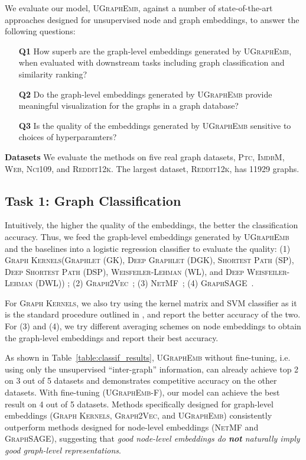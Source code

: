 \documentclass{article}
\newcommand{\model}{\textsc{UGraphEmb}\xspace}
\newcommand{\netmf}{\textsc{NetMF}\xspace}
\newcommand{\graphsage}{\textsc{GraphSAGE}\xspace}
\newcommand{\gk}{\textsc{Graph Kernels}\xspace}
\newcommand{\gv}{\textsc{Graph2Vec}\xspace}
\newcommand{\ptc}{\textsc{Ptc}\xspace}
\newcommand{\imdb}{\textsc{ImdbM}\xspace}
\newcommand{\web}{\textsc{Web}\xspace}
\newcommand{\nci}{\textsc{Nci109}\xspace}
\newcommand{\reddit}{\textsc{Reddit12k}\xspace}
\begin{document}
We evaluate our model, \model, against a number of state-of-the-art approaches designed for unsupervised node and graph embeddings, to answer the following questions:
\begin{enumerate}
\item[{\bf Q1}] How superb are the graph-level embeddings generated by \model, when evaluated with downstream tasks including graph classification and similarity ranking?
\item[{\bf Q2}] Do the graph-level embeddings generated by \model provide meaningful visualization for the graphs in a graph database? 
\item[{\bf Q3}] Is the quality of the embeddings generated by \model sensitive to choices of hyperparamters?
\end{enumerate}



\textbf{Datasets} \enspace We evaluate the methods on five real graph datasets, \ptc, \imdb, \web, \nci, and \reddit.
The largest dataset, \reddit, has 11929 graphs.

\subsection{Task 1: Graph Classification}



Intuitively, the higher the quality of the embeddings, the better the classification accuracy. Thus, we feed the graph-level embeddings generated by \model and the baselines into a logistic regression classifier to evaluate the quality: (1) \gk (\textsc{Graphlet} (\textsc{GK}), \textsc{Deep Graphlet} (\textsc{DGK}), \textsc{Shortest Path} (\textsc{SP}), \textsc{Deep Shortest Path} (\textsc{DSP}), \textsc{Weisfeiler-Lehman} (\textsc{WL}), and \textsc{Deep Weisfeiler-Lehman} (\textsc{DWL}))
; (2) \gv~\cite{narayanan2017graph2vec}; (3) \netmf~\cite{qiu2017network}; (4) \graphsage~\cite{hamilton2017inductive}. 

For \gk, we also try using the kernel matrix and SVM classifier as it is the standard procedure outlined in \cite{yanardag2015deep}, and report the better accuracy of the two. For (3) and (4), we try different averaging schemes on node embeddings to obtain the graph-level embeddings and report their best accuracy.





As shown in Table~\ref{table:classif_results},
\model without fine-tuning, i.e. using only the unsupervised ``inter-graph'' information, can already achieve top 2 on 3 out of 5 datasets and demonstrates competitive accuracy on the other datasets. With fine-tuning (\textsc{\model-F}), our model can achieve the best result on 4 
out of 5 datasets. Methods specifically designed for graph-level embeddings (\gk, \gv, and \model) consistently outperform methods designed for node-level embeddings (\netmf and \graphsage), suggesting that \textit{good node-level embeddings do \textbf{not} naturally imply good graph-level representations}.
\end{document}
